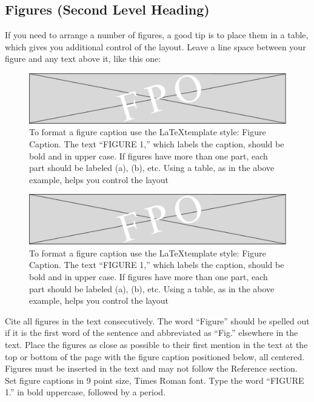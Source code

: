\documentclass{aip-cp}
\begin{document}
\subsection{Figures (Second Level Heading)}
If you need to arrange a number of figures, a good tip is to place them in a table, which gives you additional control of the layout. Leave a line space between your figure and any text above it, like this one:


\begin{figure}[b]
  \centerline{\includegraphics[width=400pt]{art/fig_2}}
  \caption{To format a figure caption use the \LaTeX template style: Figure Caption. The text ``FIGURE 1,'' which labels the caption, should be bold and in upper case. If figures have more than one part, each part should be labeled (a), (b), etc. Using a table, as in the above example, helps you control the layout}
\end{figure}

\begin{figure}
  \centerline{\includegraphics[width=500pt]{art/fig_2}}
  \caption{To format a figure caption use the \LaTeX template style: Figure Caption. The text ``FIGURE 1,'' which labels the caption, should be bold and in upper case. If figures have more than one part, each part should be labeled (a), (b), etc. Using a table, as in the above example, helps you control the layout}
\end{figure}


Cite all figures in the text consecutively. The word ``Figure'' should be spelled out if it is the first word of the sentence and abbreviated as ``Fig.'' elsewhere in the text. Place the figures as close as possible to their first mention in the text at the top or bottom of the page with the figure caption positioned below, all centered. Figures must be inserted in the text and may not follow the Reference section. Set figure captions in 9 point size, Times Roman font. Type the word ``FIGURE 1.'' in bold uppercase, followed by a period.
\end{document}
